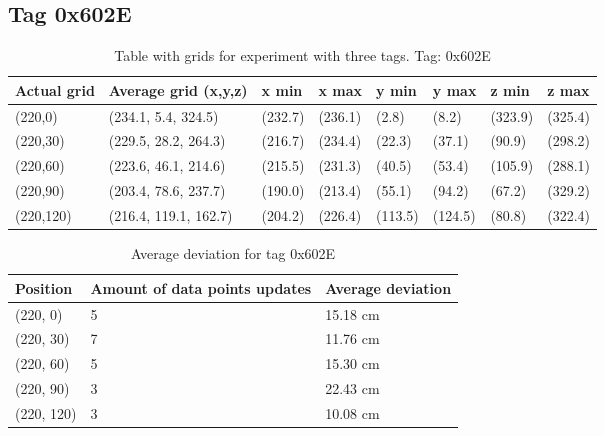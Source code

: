 \subsection{Tag 0x602E}
\begin{table}[H] 
    \centering
    \begin{tabular}{|l|l|l|l|l|l|l|l|}
        \hline
        Actual grid & Average grid (x,y,z)  & x min   & x max   & y min   & y max   & z min   & z max   \\ \hline
        (220,0)     & (234.1, 5.4, 324.5)   & (232.7) & (236.1) & (2.8)   & (8.2)   & (323.9) & (325.4) \\ \hline
        (220,30)    & (229.5, 28.2, 264.3)  & (216.7) & (234.4) & (22.3)  & (37.1)  & (90.9)  & (298.2) \\ \hline
        (220,60)    & (223.6, 46.1, 214.6)  & (215.5) & (231.3) & (40.5)  & (53.4)  & (105.9) & (288.1) \\ \hline
        (220,90)    & (203.4, 78.6, 237.7)  & (190.0) & (213.4) & (55.1)  & (94.2)  & (67.2)  & (329.2) \\ \hline
        (220,120)   & (216.4, 119.1, 162.7) & (204.2) & (226.4) & (113.5) & (124.5) & (80.8)  & (322.4) \\ \hline
    \end{tabular}
    \caption{Table with grids for experiment with three tags. Tag: 0x602E}
    \label{Tab:three-tag-experiment-result-tag-0x602E}
\end{table}

\begin{table}[H]
    \centering
    \begin{tabular}{|l|l|l|}
        \hline
        Position   & Amount of data points updates & Average deviation \\ \hline
        (220, 0)   & 5                             & 15.18 cm          \\ \hline
        (220, 30)  & 7                             & 11.76 cm          \\ \hline
        (220, 60)  & 5                             & 15.30 cm          \\ \hline
        (220, 90)  & 3                             & 22.43 cm          \\ \hline
        (220, 120) & 3                             & 10.08 cm          \\ \hline
    \end{tabular}
    \caption{Average deviation for tag 0x602E}
\end{table}


